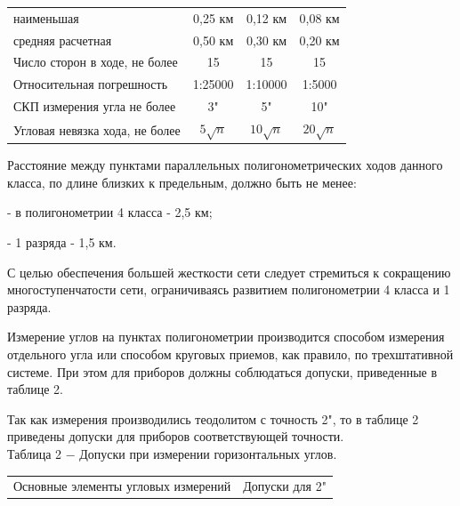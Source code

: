 \documentclass[a4paper]{article}
\begin{document}
{\begin{tabular}{|l|c|c|c|}
наименьшая & 0,25 км & 0,12 км & 0,08 км \\
средняя расчетная & 0,50 км & 0,30 км  & 0,20 км \\
\hline
Число сторон в ходе, не более & 15& 15& 15\\
\hline
Относительная погрешность & 1:25000 & 1:10000 & 1:5000\\
\hline
СКП измерения угла не более & 3" & 5" & 10"\\
\hline
Угловая невязка хода, не более & $5\sqrt{n}$ & $10\sqrt{n}$ & $20\sqrt{n}$ \\
\hline
\end{tabular}
\hfill \break
\par Расстояние между пунктами параллельных полигонометрических ходов данного класса, по длине близких к предельным, должно быть не менее:
\par - в полигонометрии 4 класса - 2,5 км;
\par - 1 разряда - 1,5 км. 
\par С целью обеспечения большей жесткости сети следует стремиться к сокращению многоступенчатости сети, ограничиваясь развитием полигонометрии 4 класса и 1 разряда.
\par Измерение углов на пунктах полигонометрии производится способом измерения отдельного угла или способом круговых приемов, как правило, по трехштативной системе. При этом для приборов должны соблюдаться допуски, приведенные в таблице 2.
\par Так как измерения производились теодолитом с точность 2", то в таблице 2 приведены допуски для приборов соответствующей точности.\\
Таблица 2 $-$ Допуски при измерении горизонтальных углов.\\
\begin{tabular}{|c|c|}
\hline
Основные элементы угловых измерений & Допуски для 2" \\


\end{tabular}}
\end{document}
